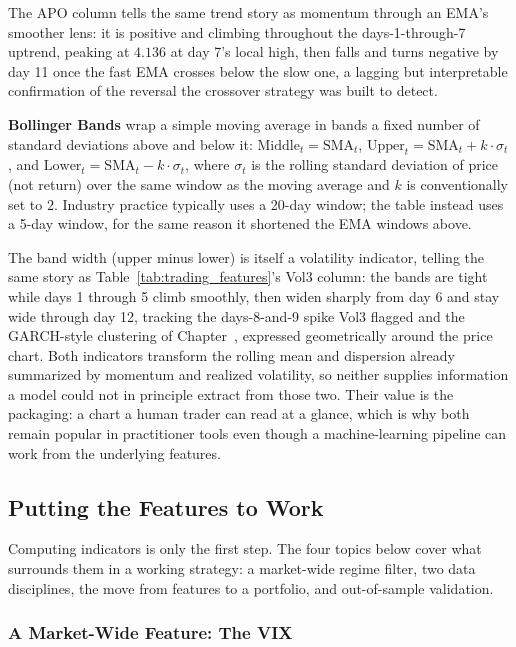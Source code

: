 \documentclass[../ai_in_finance]{subfiles}
\begin{document}
The APO column tells the same trend story as momentum through an EMA's smoother lens: it is positive and climbing throughout the days-1-through-7 uptrend, peaking at $4.136$ at day 7's local high, then falls and turns negative by day 11 once the fast EMA crosses below the slow one, a lagging but interpretable confirmation of the reversal the crossover strategy was built to detect.

\textbf{Bollinger Bands} wrap a simple moving average in bands a fixed number of standard deviations above and below it: $\text{Middle}_t = \text{SMA}_t$, $\text{Upper}_t = \text{SMA}_t + k\cdot\sigma_t$, and $\text{Lower}_t = \text{SMA}_t - k\cdot\sigma_t$, where $\sigma_t$ is the rolling standard deviation of price (not return) over the same window as the moving average and $k$ is conventionally set to $2$. Industry practice typically uses a 20-day window; the table instead uses a 5-day window, for the same reason it shortened the EMA windows above.

The band width (upper minus lower) is itself a volatility indicator, telling the same story as Table~\ref{tab:trading_features}'s Vol3 column: the bands are tight while days 1 through 5 climb smoothly, then widen sharply from day 6 and stay wide through day 12, tracking the days-8-and-9 spike Vol3 flagged and the GARCH-style clustering of Chapter~, expressed geometrically around the price chart. Both indicators transform the rolling mean and dispersion already summarized by momentum and realized volatility, so neither supplies information a model could not in principle extract from those two. Their value is the packaging: a chart a human trader can read at a glance, which is why both remain popular in practitioner tools even though a machine-learning pipeline can work from the underlying features.

\subsection{Putting the Features to Work}
\label{sec:features-to-work}

Computing indicators is only the first step. The four topics below cover what surrounds them in a working strategy: a market-wide regime filter, two data disciplines, the move from features to a portfolio, and out-of-sample validation.

\subsubsection*{A Market-Wide Feature: The VIX}
\end{document}
